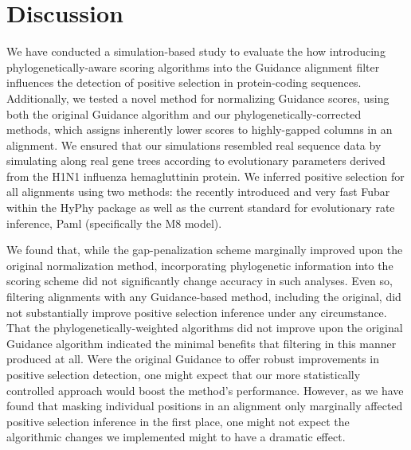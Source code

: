 \documentclass[10pt]{article}
\begin{document}










\section*{Discussion}

We have conducted a simulation-based study to evaluate the how introducing phylogenetically-aware scoring algorithms into the Guidance alignment filter influences the detection of positive selection in protein-coding sequences. Additionally, we tested a novel method for normalizing Guidance scores, using both the original Guidance algorithm and our phylogenetically-corrected methods, which assigns inherently lower scores to highly-gapped columns in an alignment. We ensured that our simulations resembled real sequence data by simulating along real gene trees according to evolutionary parameters derived from the H1N1 influenza hemagluttinin protein. We inferred positive selection for all alignments using two methods: the recently introduced and very fast Fubar \citep{Murrell2013} within the HyPhy package \citep{Pond2005} as well as the current standard for evolutionary rate inference, Paml \citep{Yang2007} (specifically the M8 model).

We found that, while the gap-penalization scheme marginally improved upon the original normalization method, incorporating phylogenetic information into the scoring scheme did not significantly change accuracy in such analyses. Even so, filtering alignments with any Guidance-based method, including the original, did not substantially improve positive selection inference under any circumstance. That the phylogenetically-weighted algorithms did not improve upon the original Guidance algorithm indicated the minimal benefits that filtering in this manner produced at all. Were the original Guidance to offer robust improvements in positive selection detection, one might expect that our more statistically controlled approach would boost the method's performance. However, as we have found that masking individual positions in an alignment only marginally affected positive selection inference in the first place, one might not expect the algorithmic changes we implemented might to have a dramatic effect.
\end{document}

